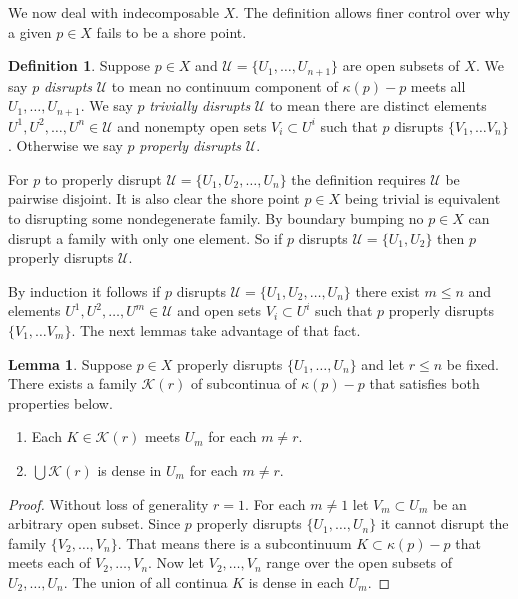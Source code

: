 \documentclass[12pt]{article}
\theoremstyle{plain}
\theoremstyle{definition}
\newtheorem{lemma}[theorem]{Lemma}
\newtheorem{definition}[theorem]{Definition}
\newcommand{\K}{\ensuremath{\kappa}}
\newcommand{\0}{\ensuremath{\varnothing}}
\newcommand{\cK}{\ensuremath{\mathcal K}}
\newcommand{\cU}{\ensuremath{\mathcal U}}
\begin{document}
We now deal with indecomposable $X$.
The definition allows finer control over why a given $p \in X$ fails to be a shore point.

\begin{definition}
Suppose $p \in X$ and $\cU = \{U_1,\ldots , U_{n+1}\}$ are open subsets of $X$.
We say $p$ \textit{disrupts} $\cU$ to mean no continuum component of $\K(p)-p$ meets all $U_1,\ldots , U_{n+1}$.
We say $p$ \textit{trivially disrupts} $\cU$ to mean there are distinct elements 
$U^1,U^2, \ldots, U^n \in \cU$ and nonempty open sets $V_i \subset U^i$ such that $p$ disrupts $\{V_1,\ldots V_n\}$.
Otherwise we say $p$ \textit{properly disrupts} $\cU$.
\end{definition}

For $p$ to properly disrupt $\cU = \{U_1,U_2, \ldots, U_n\}$ the definition requires $\cU$ be pairwise disjoint.
It is also clear the shore point $p\in X$ being trivial is equivalent to disrupting some nondegenerate family.
By boundary bumping no $p \in X$ can disrupt a family with only one element.
So if $p$ disrupts $\cU = \{U_1,U_2\}$ then $p$ properly disrupts $\cU$.

By induction it follows if $p$ disrupts $\cU = \{U_1,U_2, \ldots, U_n\}$
there exist $m \le n$ and elements $U^1,U^2, \ldots, U^m \in \cU$ and open sets $V_i \subset U^i$ such that $p$ properly disrupts $\{V_1,\ldots V_m\}$.
The next lemmas take advantage of that fact.


\begin{lemma}\label{proper}
Suppose $p \in X$ properly disrupts $\{U_1,\ldots, U_{n}\}$ and let $r \le n$ be fixed.
There exists a family $\cK(r)$ of subcontinua of $ \K(p) - p$ that satisfies both properties below.
\begin{enumerate}
	\item Each $K \in \cK(r)$ meets $U_m$ for each $m \ne r$.
	\item $\bigcup \cK(r)$ is dense in $U_m$ for each $m \ne r$.
\end{enumerate}
\end{lemma}

\begin{proof}
Without loss of generality $r=1$.
For each $m  \ne 1$ let $V_m \subset U_m$ be an arbitrary open subset.
Since $p$ properly disrupts $\{U_1,\ldots, U_{n}\}$ it cannot disrupt the family $ \{V_2,\ldots ,V_{n}\}$.
That means there is a subcontinuum \mbox{$K \subset \K(p)-p$} that meets each of $V_2,\ldots , V_{n}$.
Now let $V_2, \ldots , V_n$ range over the open subsets of $U_2, \ldots , U_n$. 
The union of all continua $K$ is dense in each $U_m$.
\end{proof}
\end{document}
